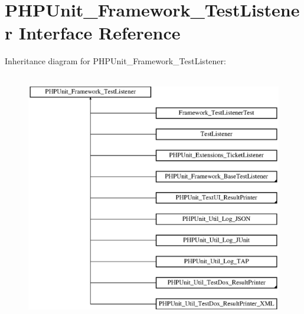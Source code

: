 \hypertarget{interface_p_h_p_unit___framework___test_listener}{}\section{P\+H\+P\+Unit\+\_\+\+Framework\+\_\+\+Test\+Listener Interface Reference}
\label{interface_p_h_p_unit___framework___test_listener}
Inheritance diagram for P\+H\+P\+Unit\+\_\+\+Framework\+\_\+\+Test\+Listener\+:\begin{figure}[H]
\begin{center}
\leavevmode
\includegraphics[height=11.000000cm]{interface_p_h_p_unit___framework___test_listener}
\end{center}
\end{figure}
